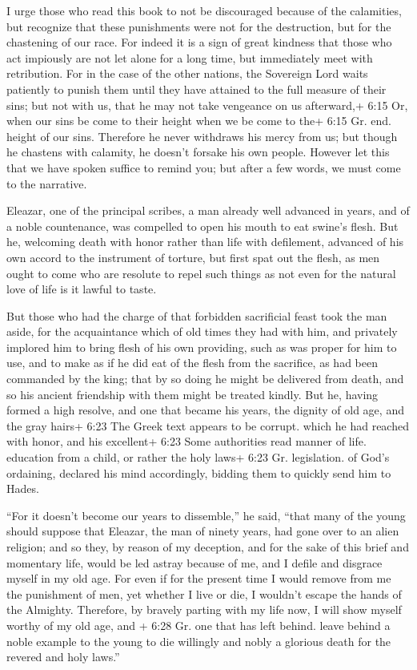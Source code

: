  I urge those who read this book to not be discouraged
because of the calamities, but recognize that these punishments were not
for the destruction, but for the chastening of our race. 
For indeed it is a sign of great kindness that those who act impiously
are not let alone for a long time, but immediately meet with
retribution.  For in the case of the other nations, the
Sovereign Lord waits patiently to punish them until they have attained
to the full measure of their sins; but not with us,  that
he may not take vengeance on us afterward,+ 6:15 Or, when our sins be
come to their height when we be come to the+ 6:15 Gr. end. height of our
sins.  Therefore he never withdraws his mercy from us; but
though he chastens with calamity, he doesn't forsake his own people.
 However let this that we have spoken suffice to remind
you; but after a few words, we must come to the narrative.

 Eleazar, one of the principal scribes, a man already well
advanced in years, and of a noble countenance, was compelled to open his
mouth to eat swine's flesh.  But he, welcoming death with
honor rather than life with defilement, advanced of his own accord to
the instrument of torture, but first spat out the flesh, 
as men ought to come who are resolute to repel such things as not even
for the natural love of life is it lawful to taste.

 But those who had the charge of that forbidden sacrificial
feast took the man aside, for the acquaintance which of old times they
had with him, and privately implored him to bring flesh of his own
providing, such as was proper for him to use, and to make as if he did
eat of the flesh from the sacrifice, as had been commanded by the king;
 that by so doing he might be delivered from death, and so
his ancient friendship with them might be treated kindly. 
But he, having formed a high resolve, and one that became his years, the
dignity of old age, and the gray hairs+ 6:23 The Greek text appears to
be corrupt. which he had reached with honor, and his excellent+ 6:23
Some authorities read manner of life. education from a child, or rather
the holy laws+ 6:23 Gr. legislation. of God's ordaining, declared his
mind accordingly, bidding them to quickly send him to Hades.

 ``For it doesn't become our years to dissemble,'' he said,
``that many of the young should suppose that Eleazar, the man of ninety
years, had gone over to an alien religion;  and so they, by
reason of my deception, and for the sake of this brief and momentary
life, would be led astray because of me, and I defile and disgrace
myself in my old age.  For even if for the present time I
would remove from me the punishment of men, yet whether I live or die, I
wouldn't escape the hands of the Almighty.  Therefore, by
bravely parting with my life now, I will show myself worthy of my old
age,  and + 6:28 Gr. one that has left behind. leave behind
a noble example to the young to die willingly and nobly a glorious death
for the revered and holy laws.''

